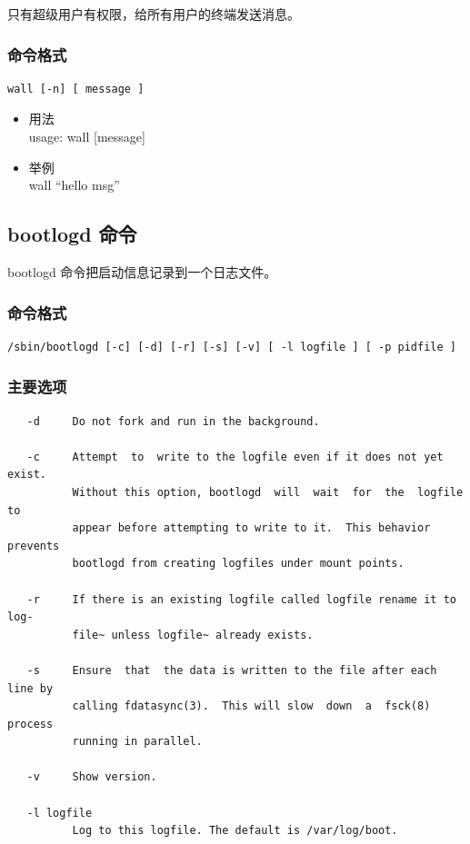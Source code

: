只有超级用户有权限，给所有用户的终端发送消息。

\subsubsection{命令格式}

{\begin{shaded}\begin{verbatim}
wall [-n] [ message ]
\end{verbatim}\end{shaded}}
\begin{itemize}
\item
  用法\\ usage: wall {[}message{]}
\item
  举例\\ wall ``hello msg''
\end{itemize}
\subsection{bootlogd 命令}

bootlogd 命令把启动信息记录到一个日志文件。

\subsubsection{命令格式}

{\begin{shaded}\begin{verbatim}
/sbin/bootlogd [-c] [-d] [-r] [-s] [-v] [ -l logfile ] [ -p pidfile ]
\end{verbatim}\end{shaded}}
\subsubsection{主要选项}

{\begin{shaded}\begin{verbatim}
   -d     Do not fork and run in the background.

   -c     Attempt  to  write to the logfile even if it does not yet exist.
          Without this option, bootlogd  will  wait  for  the  logfile  to
          appear before attempting to write to it.  This behavior prevents
          bootlogd from creating logfiles under mount points.

   -r     If there is an existing logfile called logfile rename it to log‐
          file~ unless logfile~ already exists.

   -s     Ensure  that  the data is written to the file after each line by
          calling fdatasync(3).  This will slow  down  a  fsck(8)  process
          running in parallel.

   -v     Show version.

   -l logfile
          Log to this logfile. The default is /var/log/boot.
\end{verbatim}\end{shaded}}
